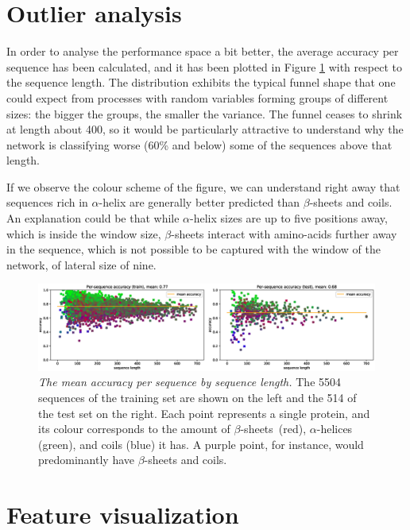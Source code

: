 \section{Outlier analysis} \label{sect:outliers}

In order to analyse the performance space a bit better, the average accuracy per sequence has been calculated, and it has been plotted in Figure \ref{fig:per_seq_acc} with respect to the sequence length. The distribution exhibits the typical funnel shape that one could expect from processes with random variables forming groups of different sizes: the bigger the groups, the smaller the variance. The funnel ceases to shrink at length about 400, so it would be particularly attractive to understand why the network is classifying worse (60\% and below) some of the sequences above that length.

If we observe the colour scheme of the figure, we can understand right away that sequences rich in $\alpha$-helix are generally better predicted than $\beta$-sheets and coils. An explanation could be that while $\alpha$-helix sizes are up to five positions away, which is inside the window size, $\beta$-sheets interact with amino-acids further away in the sequence, which is not possible to be captured with the window of the network, of lateral size of nine.

\begin{figure}
	\centering
	\includegraphics[width=1\linewidth]{Figures/per_seq_acc}
	\caption{\textit{The mean accuracy per sequence by sequence length.} The 5504 sequences of the training set are shown on the left and the 514 of the test set on the right. Each point represents a single protein, and its colour corresponds to the amount of $\beta$-sheets~(red), $\alpha$-helices (green), and coils (blue) it has. A purple point, for instance, would predominantly have $\beta$-sheets and coils.}
	\label{fig:per_seq_acc}
\end{figure}

\section{Feature visualization}

